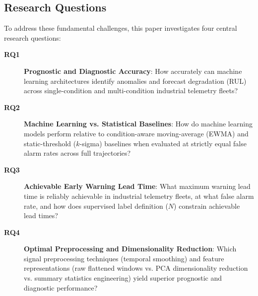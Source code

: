 \subsection{Research Questions}
To address these fundamental challenges, this paper investigates four central research questions:
\begin{description}
    \item[\textbf{RQ1}] \textbf{Prognostic and Diagnostic Accuracy}: How accurately can machine learning architectures identify anomalies and forecast degradation (RUL) across single-condition and multi-condition industrial telemetry fleets?
    \item[\textbf{RQ2}] \textbf{Machine Learning vs. Statistical Baselines}: How do machine learning models perform relative to condition-aware moving-average (EWMA) and static-threshold ($k$-sigma) baselines when evaluated at strictly equal false alarm rates across full trajectories?
    \item[\textbf{RQ3}] \textbf{Achievable Early Warning Lead Time}: What maximum warning lead time is reliably achievable in industrial telemetry fleets, at what false alarm rate, and how does supervised label definition ($N$) constrain achievable lead times?
    \item[\textbf{RQ4}] \textbf{Optimal Preprocessing and Dimensionality Reduction}: Which signal preprocessing techniques (temporal smoothing) and feature representations (raw flattened windows vs. PCA dimensionality reduction vs. summary statistics engineering) yield superior prognostic and diagnostic performance?
\end{description}

